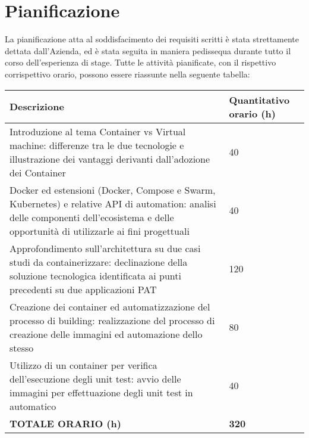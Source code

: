 \section{Pianificazione}
La pianificazione atta al soddisfacimento dei requisiti scritti è stata strettamente dettata dall'Azienda, ed è stata seguita in maniera pedissequa durante tutto il corso dell'esperienza di stage.
Tutte le attività pianificate, con il rispettivo corrispettivo orario, possono essere riassunte nella seguente tabella:
\begin{center}
\begin{tabular}{|m{25em} | m{}|} 
 \hline
 \textbf{Descrizione} & \textbf{Quantitativo orario (h)}\\ [0.5ex] 
 \hline\hline
 Introduzione al tema Container vs Virtual machine: differenze tra le due tecnologie e
illustrazione dei vantaggi derivanti dall'adozione dei Container & 40 \\ 
 \hline
 Docker ed estensioni (Docker, Compose e Swarm, Kubernetes) e relative API di
automation: analisi delle componenti dell'ecosistema e delle opportunità di utilizzarle
ai fini progettuali & 40 \\
 \hline
 Approfondimento sull'architettura su due casi studi da containerizzare: declinazione
della soluzione tecnologica identificata ai punti precedenti su due applicazioni PAT & 120 \\
 \hline
 Creazione dei container ed automatizzazione del processo di building: realizzazione
del processo di creazione delle immagini ed automazione dello stesso & 80 \\
 \hline
 Utilizzo di un container per verifica dell'esecuzione degli unit test: avvio delle
immagini per effettuazione degli unit test in automatico & 40 \\ [1ex] 
 \hline
 \textbf{TOTALE ORARIO (h)} & \textbf{320}\\
 \hline
\end{tabular}
\end{center}
